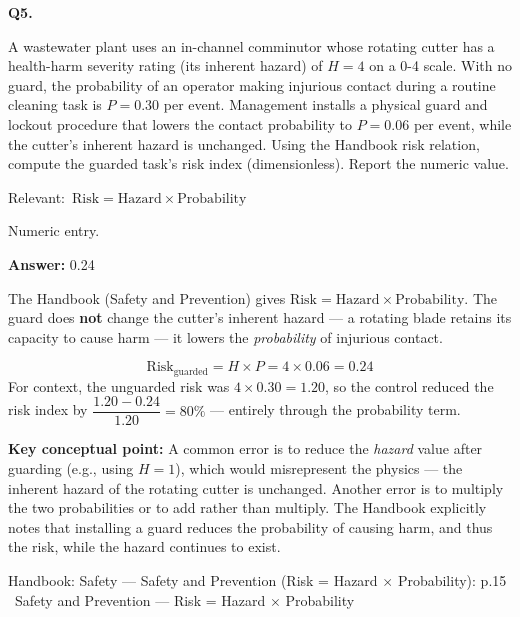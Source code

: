 \documentclass[11pt]{article}
\begin{document}
\vspace{9pt}
\filbreak
\textbf{\color{accent}Q5.}\par\vspace{2pt}
A wastewater plant uses an in-channel comminutor whose rotating cutter has a health-harm severity rating (its inherent hazard) of $H = 4$ on a 0-4 scale. With no guard, the probability of an operator making injurious contact during a routine cleaning task is $P = 0.30$ per event. Management installs a physical guard and lockout procedure that lowers the contact probability to $P = 0.06$ per event, while the cutter's inherent hazard is unchanged. Using the Handbook risk relation, compute the guarded task's risk index (dimensionless). Report the numeric value.\par\par\vspace{3pt}
{\small\color{soft}Relevant:}\ $\text{Risk} = \text{Hazard} \times \text{Probability}$\par\vspace{3pt}
{\small\color{soft}Numeric entry.}\par\vspace{3pt}
\vspace{2pt}\par\noindent\colorbox{boxbg}{\parbox{\dimexpr\linewidth-2\fboxsep\relax}{%
\vspace{2pt}\textbf{Answer:} 0.24\par\vspace{2pt}
{\small The Handbook (Safety and Prevention) gives $\text{Risk} = \text{Hazard} \times \text{Probability}$. The guard does \textbf{not} change the cutter's inherent hazard --- a rotating blade retains its capacity to cause harm --- it lowers the \emph{probability} of injurious contact.\par
\[\text{Risk}_{\text{guarded}} = H \times P = 4 \times 0.06 = 0.24\]
For context, the unguarded risk was $4 \times 0.30 = 1.20$, so the control reduced the risk index by $\dfrac{1.20 - 0.24}{1.20} = 80\%$ --- entirely through the probability term.\par
\textbf{Key conceptual point:} A common error is to reduce the \emph{hazard} value after guarding (e.g., using $H = 1$), which would misrepresent the physics --- the inherent hazard of the rotating cutter is unchanged. Another error is to multiply the two probabilities or to add rather than multiply. The Handbook explicitly notes that installing a guard reduces the probability of causing harm, and thus the risk, while the hazard continues to exist.\par}\par\vspace{2pt}
{\footnotesize\color{soft}Handbook: Safety --- Safety and Prevention (Risk = Hazard $\times$ Probability): p.15 \textbullet\ Safety and Prevention --- Risk = Hazard $\times$ Probability}\vspace{2pt}
}}
\end{document}
